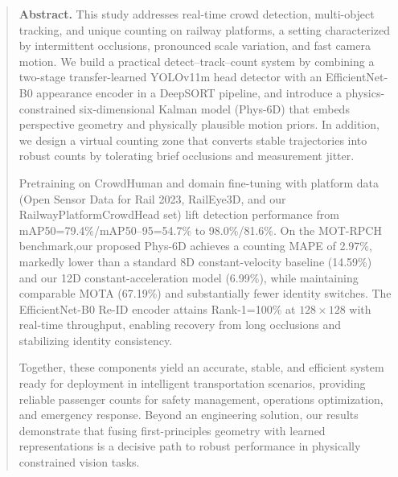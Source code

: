 \documentclass[
	a4paper,
	pagesize,
	pdftex,
	12pt,
	english,
	final,
	]{scrartcl}
\begin{document}


\mitverteidigung %
\makeTitel

\begin{abstract}
	\textbf{Abstract.} This study addresses real-time crowd detection, multi-object tracking, and unique counting on railway platforms, a setting characterized by intermittent occlusions, pronounced scale variation, and fast camera motion. We build a practical detect--track--count system by combining a two-stage transfer-learned YOLOv11m head detector with an EfficientNet-B0 appearance encoder in a DeepSORT pipeline, and introduce a physics-constrained six-dimensional Kalman model (Phys-6D) that embeds perspective geometry and physically plausible motion priors. In addition, we design a virtual counting zone that converts stable trajectories into robust counts by tolerating brief occlusions and measurement jitter.

	Pretraining on CrowdHuman and domain fine-tuning with platform data (Open Sensor Data for Rail 2023, RailEye3D, and our RailwayPlatformCrowdHead set) lift detection performance from mAP50=79.4\%/mAP50--95=54.7\% to 98.0\%/81.6\%. On the MOT-RPCH benchmark,our proposed Phys-6D achieves a counting MAPE of 2.97\%, markedly lower than a standard 8D constant-velocity baseline (14.59\%) and our 12D constant-acceleration model (6.99\%), while maintaining comparable MOTA (67.19\%) and substantially fewer identity switches. The EfficientNet-B0 Re-ID encoder attains Rank-1=100\% at $128\times 128$ with real-time throughput, enabling recovery from long occlusions and stabilizing identity consistency.

	Together, these components yield an accurate, stable, and efficient system ready for deployment in intelligent transportation scenarios, providing reliable passenger counts for safety management, operations optimization, and emergency response. Beyond an engineering solution, our results demonstrate that fusing first-principles geometry with learned representations is a decisive path to robust performance in physically constrained vision tasks.
\end{abstract}
\newpage
\end{document}
